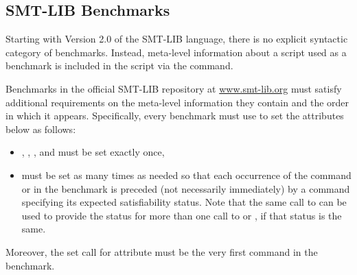 \subsection{SMT-LIB Benchmarks} \label{sec:benchmarks}
Starting with Version 2.0 of the SMT-LIB language, 
there is no explicit syntactic category of benchmarks.  
Instead, meta-level information about a script used as a benchmark is included 
in the script via the  command.  

Benchmarks in the official SMT-LIB repository at \href{http://www.smt-lib.org}{www.smt-lib.org}
must satisfy additional requirements on the meta-level information they contain
and the order in which it appears. 
Specifically, every benchmark must use  to set
the attributes below as follows: 
%
\begin{itemize}
\item
{}, , , and  must be set exactly once,
\item
{} must be set as many times as needed so that each occurrence 
of the command  or  
in the benchmark is preceded (not necessarily immediately)
by a  command specifying its expected satisfiability status.
Note that the same call to  can be used to provide the status 
for more than one call to  or ,
if that status is the same.
\end{itemize}
%
Moreover, the set  call for attribute  must be the very first command in the benchmark.
\medskip
